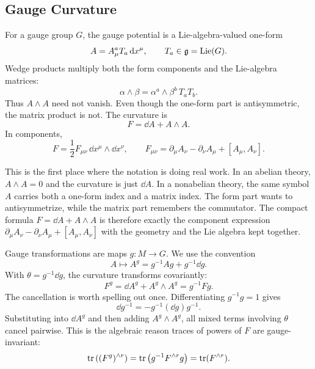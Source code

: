 \subsection{Gauge Curvature}
\label{subsec:lie-valued-forms}

For a gauge group $G$, the gauge potential is a Lie-algebra-valued one-form
\begin{equation}
  A=A_\mu^a T_a\,\mathrm{d} x^\mu,
  \qquad
  T_a\in\mathfrak g=\operatorname{Lie}(G).
  \label{eq:forms-connection}
\end{equation}
Wedge products multiply both the form components and the Lie-algebra matrices:
\begin{equation}
  \alpha\wedge\beta
  =
  \alpha^a\wedge\beta^b\,T_aT_b.
  \label{eq:forms-matrix-wedge}
\end{equation}
Thus $A\wedge A$ need not vanish. Even though the one-form part is antisymmetric, the matrix product is not. The curvature is
\begin{equation}
  F=\dd A+A\wedge A.
  \label{eq:forms-curvature}
\end{equation}
In components,
\begin{equation}
  F=\frac12 F_{\mu\nu}\,\dd x^\mu\wedge\dd x^\nu,
  \qquad
  F_{\mu\nu}
  =
  \partial_\mu A_\nu-\partial_\nu A_\mu+[A_\mu,A_\nu].
  \label{eq:forms-curvature-components}
\end{equation}

This is the first place where the notation is doing real work. In an abelian theory, $A\wedge A=0$ and the curvature is just $\dd A$. In a nonabelian theory, the same symbol $A$ carries both a one-form index and a matrix index. The form part wants to antisymmetrize, while the matrix part remembers the commutator. The compact formula $F=\dd A+A\wedge A$ is therefore exactly the component expression $\partial_\mu A_\nu-\partial_\nu A_\mu+[A_\mu,A_\nu]$ with the geometry and the Lie algebra kept together.

Gauge transformations are maps $g:M\to G$. We use the convention
\begin{equation}
  A\mapsto A^g=g^{-1}Ag+g^{-1}\dd g.
  \label{eq:forms-gauge-transformation}
\end{equation}
With $\theta=g^{-1}\dd g$, the curvature transforms covariantly:
\begin{equation}
  F^g=\dd A^g+A^g\wedge A^g=g^{-1}Fg.
  \label{eq:forms-curvature-covariant}
\end{equation}
The cancellation is worth spelling out once. Differentiating $g^{-1}g=1$ gives
\begin{equation}
  \dd g^{-1}=-g^{-1}(\dd g)g^{-1}.
  \label{eq:forms-dginv}
\end{equation}
Substituting into $\dd A^g$ and then adding $A^g\wedge A^g$, all mixed terms involving $\theta$ cancel pairwise. This is the algebraic reason traces of powers of $F$ are gauge-invariant:
\begin{equation}
  \operatorname{tr}\left((F^g)^{\wedge r}\right)
  =
  \operatorname{tr}\left(g^{-1}F^{\wedge r}g\right)
  =
  \operatorname{tr}(F^{\wedge r}).
  \label{eq:forms-gauge-invariant-polynomial}
\end{equation}

